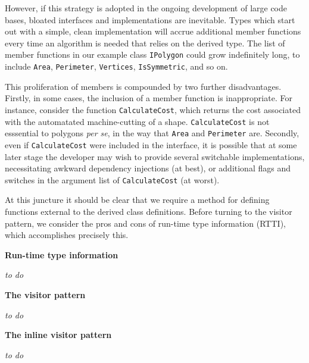 \documentclass[10pt,a4paper,twocolumn]{article}
\renewcommand\section[1]{
    \begin{minipage}[c]{0.94\linewidth}
    \large \raggedright \sffamily \textbf{#1}
    \end{minipage}
}
\newcommand\mycode[1]{{\small\texttt{#1}}}
\begin{document}
However, if this strategy is adopted in the ongoing development of large code bases, bloated interfaces and implementations are inevitable. Types which start out with a simple, clean implementation will accrue additional member functions every time an algorithm is needed that relies on the derived type.  The list of member functions in our example class \mycode{IPolygon} could grow indefinitely long, to include \mycode{Area}, \mycode{Perimeter}, \mycode{Vertices}, \mycode{IsSymmetric}, and so on. 

This proliferation of members is compounded by two further disadvantages. Firstly, in some cases, the inclusion of a member function is inappropriate. For instance, consider the function \mycode{CalculateCost}, which returns the cost associated with the automatated machine-cutting of a shape. \mycode{CalculateCost} is not esssential to polygons \emph{per se}, in the way that \mycode{Area} and \mycode{Perimeter} are. Secondly, even if \mycode{CalculateCost} were included in the interface, it is possible that at some later stage the developer may wish to provide several switchable implementations, necessitating awkward dependency injections (at best), or additional flags and switches in the argument list of \mycode{CalculateCost} (at worst).

At this juncture it should be clear that we require a method for defining functions external to the derived class definitions. Before turning to the visitor pattern, we consider the pros and cons of run-time type information (RTTI), which accomplishes precisely this.


\section{Run-time type information}

\textit{to do}


\section{The visitor pattern}

\textit{to do}


\section{The inline visitor pattern}

\textit{to do}
\end{document}
